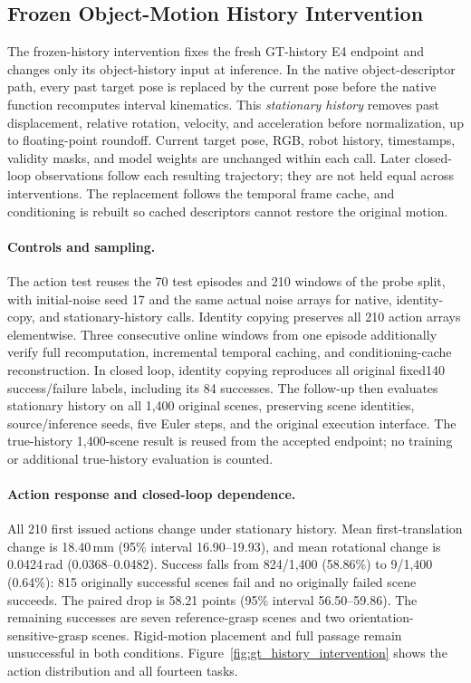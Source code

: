 \subsection{Frozen Object-Motion History Intervention}
\label{app:gt_history_intervention}
The frozen-history intervention fixes the fresh GT-history E4 endpoint and changes
only its object-history input at inference. In the native object-descriptor
path, every past target pose is replaced by the current pose before the native
function recomputes interval kinematics. This \emph{stationary history} removes
past displacement, relative rotation, velocity, and acceleration before normalization,
up to floating-point roundoff. Current target pose, RGB, robot history, timestamps, validity masks,
and model weights are unchanged within each call. Later closed-loop observations
follow each resulting trajectory; they are not held equal across interventions.
The replacement follows the temporal frame cache, and conditioning is rebuilt
so cached descriptors cannot restore the original motion.

\paragraph{Controls and sampling.}
The action test reuses the 70 test episodes and 210 windows of the probe split,
with initial-noise seed 17 and the same actual noise arrays for native,
identity-copy, and stationary-history calls. Identity copying preserves all
210 action arrays elementwise. Three consecutive online windows from one episode additionally
verify full recomputation, incremental temporal caching, and conditioning-cache
reconstruction. In closed loop, identity copying reproduces all original
fixed140 success/failure labels, including its 84 successes. The follow-up then evaluates
stationary history on all 1,400 original scenes, preserving scene identities,
source/inference seeds, five Euler steps, and the original execution interface.
The true-history 1,400-scene result is reused from the accepted endpoint;
no training or additional true-history evaluation is counted.

\paragraph{Action response and closed-loop dependence.}
All 210 first issued actions change under stationary history.
Mean first-translation change is 18.40\,mm (95\% interval 16.90--19.93),
and mean rotational change is 0.0424\,rad (0.0368--0.0482).
Success falls from 824/1,400 (58.86\%) to 9/1,400 (0.64\%):
815 originally successful scenes fail and no originally failed scene succeeds.
The paired drop is 58.21 points (95\% interval 56.50--59.86).
The remaining successes are seven reference-grasp scenes and two
orientation-sensitive-grasp scenes. Rigid-motion placement and full passage
remain unsuccessful in both conditions. Figure~\ref{fig:gt_history_intervention}
shows the action distribution and all fourteen tasks.

